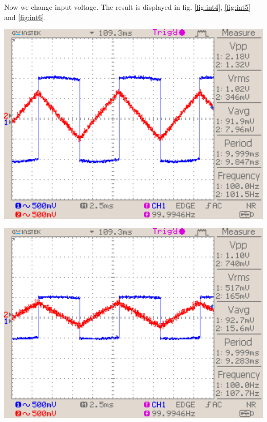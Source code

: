 \documentclass[a4paper,10pt]{article}
\newenvironment{Figure}
        {\par\medskip\noindent\minipage{\linewidth}}
        {\endminipage\par\medskip}
\numberwithin{equation}{section}
\begin{document}
\begin{multicols}{2}
  Now we change input voltage. The result is displayed in fig. \ref{fig:int4}, \ref{fig:int5} and \ref{fig:int6}.
	\begin{Figure}
		\centering
		\includegraphics[width=1\textwidth]{../data/DS0035_n.png}
		\label{fig:int4}
	\end{Figure}
	\begin{Figure}
		\centering
		\includegraphics[width=1\textwidth]{../data/DS0036_n.png}
		\label{fig:int5}
	\end{Figure}
	\begin{Figure}
		\centering

\end{Figure}
\end{multicols}
\end{document}
